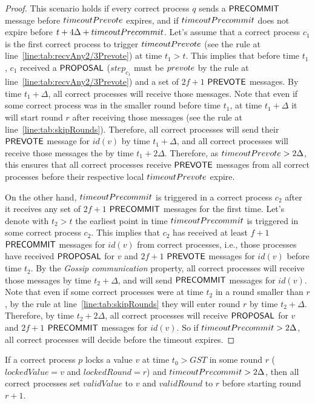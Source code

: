 \begin{proof}
This scenario holds if every correct process $q$ sends a $\mathsf{PRECOMMIT}$ message
before $timeoutPrevote$ expires, and if $timeoutPrecommit$ does not expire
before $t + 4\Delta + timeoutPrecommit$.  Let's assume that a correct process
$c_1$ is the first correct process to trigger $timeoutPrevote$ (see the rule
at line~\ref{line:tab:recvAny2/3Prevote}) at time $t_1 > t$. This implies that
before time $t_1$, $c_1$ received a $\mathsf{PROPOSAL}$ ($step_{c_1}$ must be
$prevote$ by the rule at line~\ref{line:tab:recvAny2/3Prevote}) and a set of
$2f+1$ $\mathsf{PREVOTE}$ messages.  By time $t_1 + \Delta$, all correct processes will
receive those messages. Note that even if some correct process was in the
smaller round before time $t_1$, at time $t_1 + \Delta$ it will start round $r$
after receiving those messages (see the rule at
line~\ref{line:tab:skipRounds}).  Therefore, all correct processes will send
their $\mathsf{PREVOTE}$ message for $id(v)$ by time $t_1 + \Delta$, and all correct
processes will receive those messages the by time $t_1 + 2\Delta$.  Therefore,
as $timeoutPrevote > 2\Delta$, this ensures that all correct processes receive
$\mathsf{PREVOTE}$ messages from all correct processes before their respective local
$timeoutPrevote$ expire.   

On the other hand, $timeoutPrecommit$ is triggered in a correct process $c_2$
after it receives any set of $2f+1$ $\mathsf{PRECOMMIT}$ messages for the first time.
Let's denote with $t_2 > t$ the earliest point in time $timeoutPrecommit$ is
triggered in some correct process $c_2$. This implies that $c_2$ has received
at least $f+1$ $\mathsf{PRECOMMIT}$ messages for $id(v)$ from correct processes, i.e.,
those processes have received $\mathsf{PROPOSAL}$ for $v$ and $2f+1$ $\mathsf{PREVOTE}$
messages for $id(v)$ before time $t_2$. By the \emph{Gossip communication}
property, all correct processes will receive those messages by time $t_2 +
\Delta$, and will send $\mathsf{PRECOMMIT}$ messages for $id(v)$. Note that even if
some correct processes were at time $t_2$ in a round smaller than $r$, by the
rule at line~\ref{line:tab:skipRounds} they will enter round $r$ by time $t_2 +
\Delta$.  Therefore, by time $t_2 + 2\Delta$, all correct processes will
receive $\mathsf{PROPOSAL}$ for $v$ and $2f+1$ $\mathsf{PRECOMMIT}$ messages for $id(v)$. So if
$timeoutPrecommit > 2\Delta$, all correct processes will decide before the
timeout expires.         \end{proof}	


\begin{lemma} \label{lemma:validValue} If a correct process $p$ locks a value
    $v$ at time $t_0 > GST$ in some round $r$ ($lockedValue = v$ and
    $lockedRound = r$) and $timeoutPrecommit> 2\Delta$, then all correct
    processes set $validValue$ to $v$ and $validRound$ to $r$ before starting
    round $r+1$.  \end{lemma}
 
